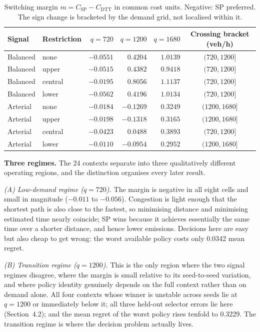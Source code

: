\documentclass[10pt,a4paper]{article}
\begin{document}
\begin{table}[htbp]\centering\small
\caption{Switching margin $m=C_{\mathrm{SP}}-C_{\mathrm{DTT}}$ in common cost units. Negative: SP preferred. The sign change is bracketed by the demand grid, not localised within it.}\label{tab:margin}
\begin{tabular}{llrrrc}\toprule
Signal & Restriction & $q=720$ & $q=1200$ & $q=1680$ & Crossing bracket (veh/h)\\\midrule
Balanced & none    & $-0.0551$ & $0.4204$ & $1.0139$ & $(720,1200]$\\
Balanced & upper   & $-0.0515$ & $0.4382$ & $0.9418$ & $(720,1200]$\\
Balanced & central & $-0.0195$ & $0.8056$ & $1.1137$ & $(720,1200]$\\
Balanced & lower   & $-0.0562$ & $0.4196$ & $1.0134$ & $(720,1200]$\\\midrule
Arterial & none    & $-0.0184$ & $-0.1269$ & $0.3249$ & $(1200,1680]$\\
Arterial & upper   & $-0.0198$ & $-0.1318$ & $0.3165$ & $(1200,1680]$\\
Arterial & central & $-0.0423$ & $0.0488$ & $0.3893$ & $(720,1200]$\\
Arterial & lower   & $-0.0110$ & $-0.0954$ & $0.2952$ & $(1200,1680]$\\
\bottomrule\end{tabular}\end{table}

\textbf{Three regimes.} The 24 contexts separate into three qualitatively different operating regions, and the distinction organises every later result.

\emph{(A) Low-demand regime ($q=720$).} The margin is negative in all eight cells and small in magnitude ($-0.011$ to $-0.056$). Congestion is light enough that the shortest path is also close to the fastest, so minimising distance and minimising estimated time nearly coincide; SP wins because it achieves essentially the same time over a shorter distance, and hence lower emissions. Decisions here are easy but also cheap to get wrong: the worst available policy costs only 0.0342 mean regret.

\emph{(B) Transition regime ($q=1200$).} This is the only region where the two signal regimes disagree, where the margin is small relative to its seed-to-seed variation, and where policy identity genuinely depends on the full context rather than on demand alone. All four contexts whose winner is unstable across seeds lie at $q=1200$ or immediately below it; all three held-out selector errors lie here (Section~4.2); and the mean regret of the worst policy rises tenfold to 0.3229. The transition regime is where the decision problem actually lives.
\end{document}
